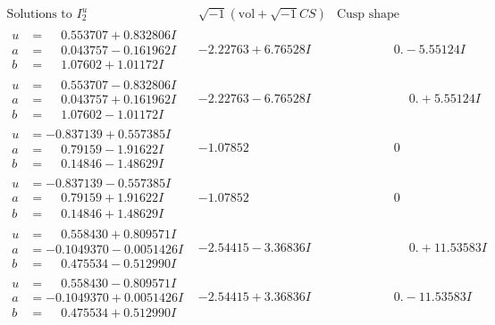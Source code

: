 \documentclass[1p]{elsarticle_modified}
\theoremstyle{definition}
\newcommand{\I}{\sqrt{-1}}
\begin{document}
$$\begin{array}{c|c|c}  
\text{Solutions to }I^u_{2}& \I (\text{vol} + \sqrt{-1}CS) & \text{Cusp shape}\\
 \hline 
\begin{aligned}
u &= \phantom{-}0.553707 + 0.832806 I \\
a &= \phantom{-}0.043757 - 0.161962 I \\
b &= \phantom{-}1.07602 + 1.01172 I\end{aligned}
 & -2.22763 + 6.76528 I & \phantom{-0.000000 } 0. - 5.55124 I \\ \hline\begin{aligned}
u &= \phantom{-}0.553707 - 0.832806 I \\
a &= \phantom{-}0.043757 + 0.161962 I \\
b &= \phantom{-}1.07602 - 1.01172 I\end{aligned}
 & -2.22763 - 6.76528 I & \phantom{-0.000000 -}0. + 5.55124 I \\ \hline\begin{aligned}
u &= -0.837139 + 0.557385 I \\
a &= \phantom{-}0.79159 - 1.91622 I \\
b &= \phantom{-}0.14846 - 1.48629 I\end{aligned}
 & -1.07852\phantom{ +0.000000I} & \phantom{-0.000000 } 0 \\ \hline\begin{aligned}
u &= -0.837139 - 0.557385 I \\
a &= \phantom{-}0.79159 + 1.91622 I \\
b &= \phantom{-}0.14846 + 1.48629 I\end{aligned}
 & -1.07852\phantom{ +0.000000I} & \phantom{-0.000000 } 0 \\ \hline\begin{aligned}
u &= \phantom{-}0.558430 + 0.809571 I \\
a &= -0.1049370 - 0.0051426 I \\
b &= \phantom{-}0.475534 - 0.512990 I\end{aligned}
 & -2.54415 - 3.36836 I & \phantom{-0.000000 -}0. + 11.53583 I \\ \hline\begin{aligned}
u &= \phantom{-}0.558430 - 0.809571 I \\
a &= -0.1049370 + 0.0051426 I \\
b &= \phantom{-}0.475534 + 0.512990 I\end{aligned}
 & -2.54415 + 3.36836 I & \phantom{-0.000000 } 0. - 11.53583 I \\ \hline\begin{aligned}

\end{aligned}
\end{array}$$
\end{document}
